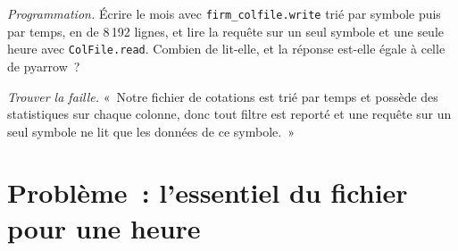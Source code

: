 \begin{exercise}[$\star\star\star$]\label{exo:pl:columnar-formats:7}
\emph{Programmation.} Écrire le mois avec \texttt{firm\_colfile.write} trié par symbole puis par temps, en  de 8\,192 lignes,
et lire la requête sur un seul symbole et une seule heure avec \texttt{ColFile.read}. Combien de  lit-elle, et la réponse
est-elle égale à celle de pyarrow~?
\end{exercise}

\begin{exercise}[$\star\star\star$]\label{exo:pl:columnar-formats:8}
\emph{Trouver la faille.} «~Notre fichier de cotations est trié par temps et possède des statistiques sur chaque colonne, donc tout filtre est reporté et une
requête sur un seul symbole ne lit que les données de ce symbole.~»
\end{exercise}

\section{Problème~: l'essentiel du fichier pour une heure}

